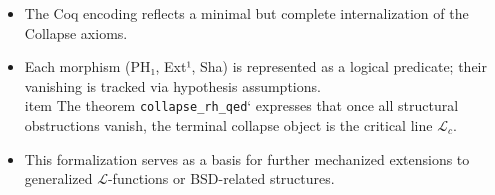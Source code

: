 \documentclass[11pt]{article}
\begin{document}
\begin{itemize}
    \item The Coq encoding reflects a minimal but complete internalization of the Collapse axioms.
    \item Each morphism (PH₁, Ext¹, Sha) is represented as a logical predicate; their vanishing is tracked via hypothesis assumptions.
    \\item The theorem \texttt{collapse\_rh\_qed}` expresses that once all structural obstructions vanish, the terminal collapse object is the critical line $\mathcal{L}_c$.
    \item This formalization serves as a basis for further mechanized extensions to generalized $\mathcal{L}$-functions or BSD-related structures.
\end{itemize}
\end{document}
